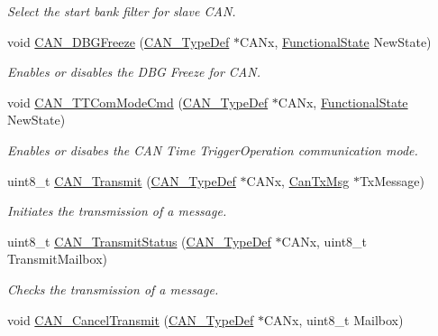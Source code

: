 \begin{DoxyCompactItemize}
\begin{DoxyCompactList}\small\item\em Select the start bank filter for slave C\+AN. \end{DoxyCompactList}\item 
void \hyperlink{group___c_a_n___exported___functions_gac0e2d33e08caf49d1f1251f0dcc20213}{C\+A\+N\+\_\+\+D\+B\+G\+Freeze} (\hyperlink{struct_c_a_n___type_def}{C\+A\+N\+\_\+\+Type\+Def} $\ast$C\+A\+Nx, \hyperlink{group___exported__types_gac9a7e9a35d2513ec15c3b537aaa4fba1}{Functional\+State} New\+State)
\begin{DoxyCompactList}\small\item\em Enables or disables the D\+BG Freeze for C\+AN. \end{DoxyCompactList}\item 
void \hyperlink{group___c_a_n___exported___functions_ga94740177bab153ca5b102d122f9a8cca}{C\+A\+N\+\_\+\+T\+T\+Com\+Mode\+Cmd} (\hyperlink{struct_c_a_n___type_def}{C\+A\+N\+\_\+\+Type\+Def} $\ast$C\+A\+Nx, \hyperlink{group___exported__types_gac9a7e9a35d2513ec15c3b537aaa4fba1}{Functional\+State} New\+State)
\begin{DoxyCompactList}\small\item\em Enables or disabes the C\+AN Time Trigger\+Operation communication mode. \end{DoxyCompactList}\item 
uint8\+\_\+t \hyperlink{group___c_a_n___exported___functions_gaccfcb81f76f58400077c7b2d8641dd83}{C\+A\+N\+\_\+\+Transmit} (\hyperlink{struct_c_a_n___type_def}{C\+A\+N\+\_\+\+Type\+Def} $\ast$C\+A\+Nx, \hyperlink{struct_can_tx_msg}{Can\+Tx\+Msg} $\ast$Tx\+Message)
\begin{DoxyCompactList}\small\item\em Initiates the transmission of a message. \end{DoxyCompactList}\item 
uint8\+\_\+t \hyperlink{group___c_a_n___exported___functions_ga68ab05a0a6cdfcc2b6f6b6b2c10848e2}{C\+A\+N\+\_\+\+Transmit\+Status} (\hyperlink{struct_c_a_n___type_def}{C\+A\+N\+\_\+\+Type\+Def} $\ast$C\+A\+Nx, uint8\+\_\+t Transmit\+Mailbox)
\begin{DoxyCompactList}\small\item\em Checks the transmission of a message. \end{DoxyCompactList}\item 
void \hyperlink{group___c_a_n___exported___functions_ga81106cdf5395a1947bfc87ec1685829e}{C\+A\+N\+\_\+\+Cancel\+Transmit} (\hyperlink{struct_c_a_n___type_def}{C\+A\+N\+\_\+\+Type\+Def} $\ast$C\+A\+Nx, uint8\+\_\+t Mailbox)

\end{DoxyCompactItemize}
